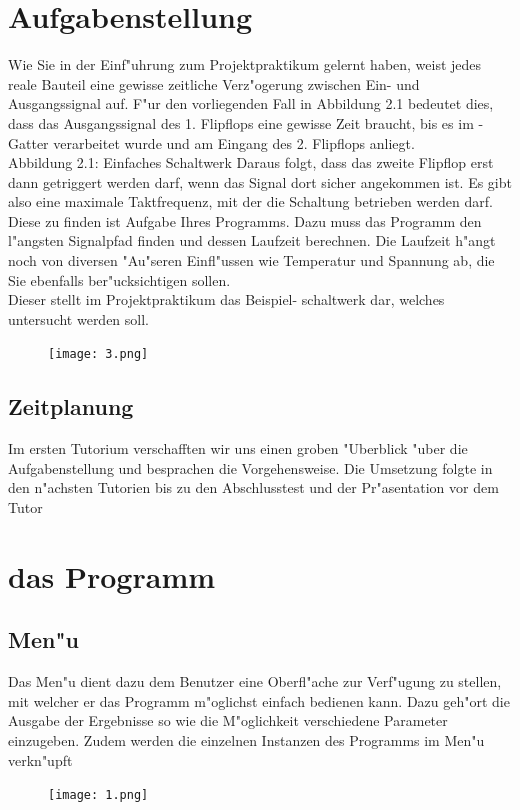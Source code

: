 \documentclass[a4paper,10pt,twoside]{report}
\begin{document}
\section{Aufgabenstellung}
Wie Sie in der Einf"uhrung zum Projektpraktikum gelernt haben, weist jedes reale Bauteil eine gewisse zeitliche Verz"ogerung zwischen Ein- und Ausgangssignal auf. F"ur den vorliegenden Fall in Abbildung 2.1 bedeutet dies, dass das Ausgangssignal des 1. Flipflops eine gewisse Zeit braucht, bis es im -Gatter
verarbeitet wurde und am Eingang des 2. Flipflops anliegt.
\\
Abbildung 2.1: Einfaches Schaltwerk
Daraus folgt, dass das zweite Flipflop erst dann getriggert werden darf, wenn das Signal dort sicher
angekommen ist. Es gibt also eine maximale Taktfrequenz, mit der die Schaltung betrieben werden darf.
Diese zu finden ist Aufgabe Ihres Programms. Dazu muss das Programm den l"angsten Signalpfad finden
und dessen Laufzeit berechnen. Die Laufzeit h"angt noch von diversen "Au"seren Einfl"ussen wie Temperatur
und Spannung ab, die Sie ebenfalls ber"ucksichtigen sollen.
\\
 Dieser stellt im Projektpraktikum das Beispiel-
schaltwerk dar, welches untersucht werden soll. 
\begin{figure}[htp]
\centering
\texttt{[image: 3.png]}
\caption{}
\label{}
\end{figure}

\subsection{Zeitplanung}
Im ersten Tutorium verschafften wir uns einen groben "Uberblick "uber die Aufgabenstellung und besprachen die Vorgehensweise. Die Umsetzung folgte in den n"achsten Tutorien bis zu den Abschlusstest und der Pr"asentation vor dem Tutor 
\section{das Programm}
\subsection{Men"u}
Das Men"u dient dazu dem Benutzer eine Oberfl"ache zur Verf"ugung zu stellen, mit welcher er das Programm m"oglichst einfach bedienen kann. Dazu geh"ort die Ausgabe der Ergebnisse so wie die M"oglichkeit verschiedene Parameter einzugeben. Zudem werden die einzelnen Instanzen des Programms im Men"u verkn"upft
\begin{figure}[htp]
\centering
\texttt{[image: 1.png]}
\caption{}
\label{}
\end{figure}
\end{document}

